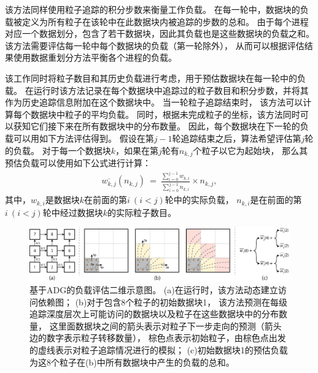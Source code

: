 该方法同样使用粒子追踪的积分步数来衡量工作负载。
在每一轮中，数据块的负载被定义为所有粒子在该轮中在此数据块内被追踪的步数的总和。
由于每个进程对应一个数据划分，包含了若干数据块，因此其负载也是这些数据块的负载之和。
该方法需要评估每一轮中每个数据块的负载（第一轮除外），
从而可以根据评估结果使用数据重划分方法平衡各个进程的负载。

该工作同时将粒子数目和其历史负载进行考虑，用于预估数据块在每一轮中的负载。
在运行时该方法记录在每个数据块中追踪过的粒子数目和积分步数，并将其作为历史追踪信息附加在这个数据块中。
当一轮粒子追踪结束时，
该方法可以计算每个数据块中粒子的平均负载。
同时，根据未完成粒子的坐标，该方法同时可以获知它们接下来在所有数据块中的分布数量。
因此，每个数据块在下一轮的负载可以用如下方法评估得到。
假设在第$j-1$轮追踪结束之后，算法希望评估第$j$轮的负载。
对于每一个数据块$k$，如果在第$j$轮有$n_{k,j}$个粒子以它为起始块，
那么其预估负载可以使用如下公式进行计算：
\begin{equation}
\label{equ:dynamicdr:estimate}
\begin{aligned}
\overline{w_{k,j}}(n_{k,j})\ =\ \frac{\sum\nolimits_{i=0}^{j-1}w_{k,i}}{\sum\nolimits_{i=0}^{j-1}n_{k,i}} \times n_{k,j},
\end{aligned}
\end{equation}
其中，$w_{k,i}$是数据块$k$在前面的第$i\ (i<j)$轮中的实际负载，
$n_{k,i}$是在前面的第$i\ (i<j)$轮中经过数据块$k$的实际粒子数目。

\begin{figure}[!tb]
  \centering
  \includegraphics[width=\linewidth]{image/loadbalance/estimate.eps}
  \caption{
    基于ADG的负载评估二维示意图。\parencite{ZhangGYP18}
    (a)在运行时，该方法动态建立访问依赖图；
    (b)对于包含8个粒子的初始数据块1，
    该方法预测在每级追踪深度层次上可能访问的数据块以及粒子在这些数据块中的分布数量，
    这里面数据块之间的箭头表示对粒子下一步走向的预测（箭头边的数字表示粒子转移数量），
    棕色点表示初始粒子，由棕色点出发的虚线表示对粒子追踪情况进行的模拟；
    (c)初始数据块1的预估负载为这8个粒子在(b)中所有数据块中产生的负载的总和。
  }
  \label{fig:dynamicdr:estimate}
\end{figure}

